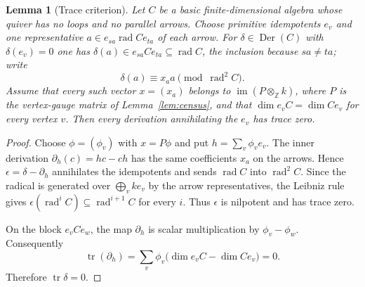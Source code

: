 \documentclass[11pt]{amsart}
\theoremstyle{plain}
\newtheorem{lemma}[theorem]{Lemma}
\theoremstyle{definition}
\DeclareMathOperator{\rad}{rad}
\DeclareMathOperator{\Der}{Der}
\DeclareMathOperator{\tr}{tr}
\newcommand{\ZZ}{\mathbb{Z}}
\begin{document}
\begin{lemma}[Trace criterion]\label{lem:trace}
Let $C$ be a basic finite-dimensional algebra whose quiver has no loops and no parallel arrows. Choose
primitive idempotents $e_v$ and one representative $a\in e_{sa}\rad C e_{ta}$ of each arrow. For
$\delta\in\Der(C)$ with $\delta(e_v)=0$ one has $\delta(a)\in e_{sa}Ce_{ta}\subseteq\rad C$, the inclusion
because $sa\neq ta$; write
\[
 \delta(a)\equiv x_a a\pmod{\rad^2C}.
\]
Assume that every such vector $x=(x_a)$ belongs to $\operatorname{im}(P\otimes_\ZZ k)$, where $P$ is the
vertex-gauge matrix of Lemma~\ref{lem:census}, and that $\dim e_vC=\dim Ce_v$ for every vertex $v$. Then every
derivation annihilating the $e_v$ has trace zero.
\end{lemma}

\begin{proof}
Choose $\phi=(\phi_v)$ with $x=P\phi$ and put $h=\sum_v\phi_ve_v$. The inner derivation $\partial_h(c)=hc-ch$
has the same coefficients $x_a$ on the arrows. Hence $\epsilon=\delta-\partial_h$ annihilates the idempotents
and sends $\rad C$ into $\rad^2C$. Since the radical is generated over $\bigoplus_vke_v$ by the arrow
representatives, the Leibniz rule gives $\epsilon(\rad^iC)\subseteq\rad^{i+1}C$ for every $i$. Thus $\epsilon$
is nilpotent and has trace zero.

On the block $e_vCe_w$, the map $\partial_h$ is scalar multiplication by $\phi_v-\phi_w$. Consequently
\[
 \tr(\partial_h)=\sum_v\phi_v\bigl(\dim e_vC-\dim Ce_v\bigr)=0.
\]
Therefore $\tr\delta=0$.
\end{proof}
\end{document}
